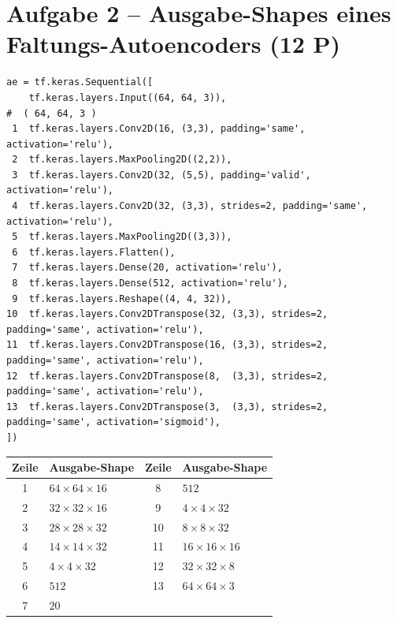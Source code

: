 \documentclass[10pt,a4paper]{article}
\newcommand{\pkt}[1]{\hfill\textbf{(#1 P)}}
\begin{document}
\newpage
\section*{Aufgabe 2 -- Ausgabe-Shapes eines Faltungs-Autoencoders \pkt{12}}

\begin{lstlisting}
ae = tf.keras.Sequential([
    tf.keras.layers.Input((64, 64, 3)),                                   #  ( 64, 64, 3 )
 1  tf.keras.layers.Conv2D(16, (3,3), padding='same', activation='relu'),
 2  tf.keras.layers.MaxPooling2D((2,2)),
 3  tf.keras.layers.Conv2D(32, (5,5), padding='valid', activation='relu'),
 4  tf.keras.layers.Conv2D(32, (3,3), strides=2, padding='same', activation='relu'),
 5  tf.keras.layers.MaxPooling2D((3,3)),
 6  tf.keras.layers.Flatten(),
 7  tf.keras.layers.Dense(20, activation='relu'),
 8  tf.keras.layers.Dense(512, activation='relu'),
 9  tf.keras.layers.Reshape((4, 4, 32)),
10  tf.keras.layers.Conv2DTranspose(32, (3,3), strides=2, padding='same', activation='relu'),
11  tf.keras.layers.Conv2DTranspose(16, (3,3), strides=2, padding='same', activation='relu'),
12  tf.keras.layers.Conv2DTranspose(8,  (3,3), strides=2, padding='same', activation='relu'),
13  tf.keras.layers.Conv2DTranspose(3,  (3,3), strides=2, padding='same', activation='sigmoid'),
])
\end{lstlisting}

\begin{center}
\begin{tabular}{|c|p{4.2cm}||c|p{4.2cm}|}
\hline
Zeile & Ausgabe-Shape & Zeile & Ausgabe-Shape \\ \hline
1 & \rule{0pt}{13pt}\color{loesfarbe}$64\times64\times16$ & 8 & \rule{0pt}{13pt}\color{loesfarbe}$512$\\ \hline
2 & \rule{0pt}{13pt}\color{loesfarbe}$32\times32\times16$ & 9 & \rule{0pt}{13pt}\color{loesfarbe}$4\times4\times32$\\ \hline
3 & \rule{0pt}{13pt}\color{loesfarbe}$28\times28\times32$ & 10 & \rule{0pt}{13pt}\color{loesfarbe}$8\times8\times32$\\ \hline
4 & \rule{0pt}{13pt}\color{loesfarbe}$14\times14\times32$ & 11 & \rule{0pt}{13pt}\color{loesfarbe}$16\times16\times16$\\ \hline
5 & \rule{0pt}{13pt}\color{loesfarbe}$4\times4\times32$ & 12 & \rule{0pt}{13pt}\color{loesfarbe}$32\times32\times8$\\ \hline
6 & \rule{0pt}{13pt}\color{loesfarbe}$512$ & 13 & \rule{0pt}{13pt}\color{loesfarbe}$64\times64\times3$\\ \hline
7 & \rule{0pt}{13pt}\color{loesfarbe}$20$ & & \\ \hline
\end{tabular}
\end{center}
\end{document}
